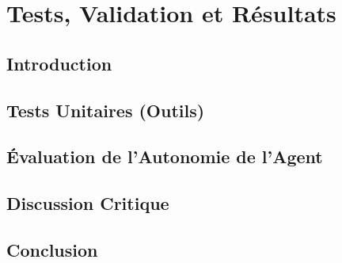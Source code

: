 \chapter{Tests, Validation et Résultats}
\section{Introduction}

\section{Tests Unitaires (Outils)}

\section{Évaluation de l'Autonomie de l'Agent}

\section{Discussion Critique}

\section{Conclusion}
